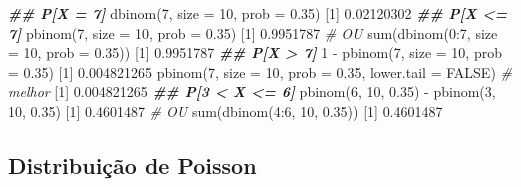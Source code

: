 \documentclass[
  10pt,
  a4paper]{book}
\newenvironment{Shaded}{\begin{snugshade}}{\end{snugshade}}
\newcommand{\AttributeTok}[1]{\textcolor[rgb]{0.77,0.63,0.00}{#1}}
\newcommand{\CommentTok}[1]{\textcolor[rgb]{0.56,0.35,0.01}{\textit{#1}}}
\newcommand{\ConstantTok}[1]{\textcolor[rgb]{0.00,0.00,0.00}{#1}}
\newcommand{\DecValTok}[1]{\textcolor[rgb]{0.00,0.00,0.81}{#1}}
\newcommand{\DocumentationTok}[1]{\textcolor[rgb]{0.56,0.35,0.01}{\textbf{\textit{#1}}}}
\newcommand{\FloatTok}[1]{\textcolor[rgb]{0.00,0.00,0.81}{#1}}
\newcommand{\FunctionTok}[1]{\textcolor[rgb]{0.00,0.00,0.00}{#1}}
\newcommand{\NormalTok}[1]{#1}
\newcommand{\SpecialCharTok}[1]{\textcolor[rgb]{0.00,0.00,0.00}{#1}}
\begin{document}
\begin{Shaded}
\begin{Highlighting}[]
\DocumentationTok{\#\# P[X = 7]}
\FunctionTok{dbinom}\NormalTok{(}\DecValTok{7}\NormalTok{, }\AttributeTok{size =} \DecValTok{10}\NormalTok{, }\AttributeTok{prob =} \FloatTok{0.35}\NormalTok{)}
\NormalTok{[}\DecValTok{1}\NormalTok{] }\FloatTok{0.02120302}
\DocumentationTok{\#\# P[X \textless{}= 7]}
\FunctionTok{pbinom}\NormalTok{(}\DecValTok{7}\NormalTok{, }\AttributeTok{size =} \DecValTok{10}\NormalTok{, }\AttributeTok{prob =} \FloatTok{0.35}\NormalTok{)}
\NormalTok{[}\DecValTok{1}\NormalTok{] }\FloatTok{0.9951787}
\CommentTok{\# OU}
\FunctionTok{sum}\NormalTok{(}\FunctionTok{dbinom}\NormalTok{(}\DecValTok{0}\SpecialCharTok{:}\DecValTok{7}\NormalTok{, }\AttributeTok{size =} \DecValTok{10}\NormalTok{, }\AttributeTok{prob =} \FloatTok{0.35}\NormalTok{))}
\NormalTok{[}\DecValTok{1}\NormalTok{] }\FloatTok{0.9951787}
\DocumentationTok{\#\# P[X \textgreater{} 7]}
\DecValTok{1} \SpecialCharTok{{-}} \FunctionTok{pbinom}\NormalTok{(}\DecValTok{7}\NormalTok{, }\AttributeTok{size =} \DecValTok{10}\NormalTok{, }\AttributeTok{prob =} \FloatTok{0.35}\NormalTok{)}
\NormalTok{[}\DecValTok{1}\NormalTok{] }\FloatTok{0.004821265}
\FunctionTok{pbinom}\NormalTok{(}\DecValTok{7}\NormalTok{, }\AttributeTok{size =} \DecValTok{10}\NormalTok{, }\AttributeTok{prob =} \FloatTok{0.35}\NormalTok{, }\AttributeTok{lower.tail =} \ConstantTok{FALSE}\NormalTok{) }\CommentTok{\# melhor}
\NormalTok{[}\DecValTok{1}\NormalTok{] }\FloatTok{0.004821265}
\DocumentationTok{\#\# P[3 \textless{} X \textless{}= 6]}
\FunctionTok{pbinom}\NormalTok{(}\DecValTok{6}\NormalTok{, }\DecValTok{10}\NormalTok{, }\FloatTok{0.35}\NormalTok{) }\SpecialCharTok{{-}} \FunctionTok{pbinom}\NormalTok{(}\DecValTok{3}\NormalTok{, }\DecValTok{10}\NormalTok{, }\FloatTok{0.35}\NormalTok{)}
\NormalTok{[}\DecValTok{1}\NormalTok{] }\FloatTok{0.4601487}
\CommentTok{\# OU}
\FunctionTok{sum}\NormalTok{(}\FunctionTok{dbinom}\NormalTok{(}\DecValTok{4}\SpecialCharTok{:}\DecValTok{6}\NormalTok{, }\DecValTok{10}\NormalTok{, }\FloatTok{0.35}\NormalTok{))}
\NormalTok{[}\DecValTok{1}\NormalTok{] }\FloatTok{0.4601487}
\end{Highlighting}
\end{Shaded}

\hypertarget{distribuiuxe7uxe3o-de-poisson}{%
\subsection{Distribuição de Poisson}\label{distribuiuxe7uxe3o-de-poisson}}
\end{document}
